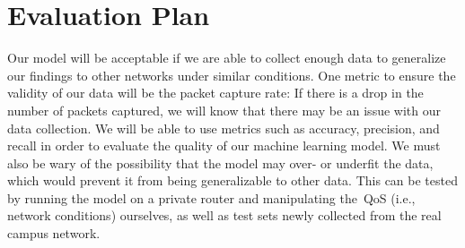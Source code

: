 \section{Evaluation Plan}\label{evaluation}
    Our model will be acceptable if we are able to collect enough data to generalize our findings to other networks under similar conditions. One metric to ensure the validity of our data will be the packet capture rate: If there is a drop in the number of packets captured, we will know that there may be an issue with our data collection. We will be able to use metrics such as accuracy, precision, and recall in order to evaluate the quality of our machine learning model. We must also be wary of the possibility that the model may over- or underfit the data, which would prevent it from being generalizable to other data. This can be tested by running the model on a private router and manipulating the~QoS (i.e., network conditions) ourselves, as well as test sets newly collected from the real campus network. 

